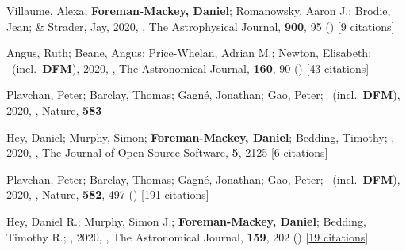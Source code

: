 \item[{\color{numcolor}\scriptsize59}] Villaume, Alexa; \textbf{Foreman-Mackey, Daniel}; Romanowsky, Aaron J.; Brodie, Jean; \& Strader, Jay, 2020, , The Astrophysical Journal, \textbf{900}, 95 () [\href{https://ui.adsabs.harvard.edu/abs/2020ApJ...900...95V}{9 citations}]

\item[{\color{numcolor}\scriptsize58}] Angus, Ruth; Beane, Angus; Price-Whelan, Adrian M.; Newton, Elisabeth; \etal\ (incl.\ \textbf{DFM}), 2020, , The Astronomical Journal, \textbf{160}, 90 () [\href{https://ui.adsabs.harvard.edu/abs/2020AJ....160...90A}{43 citations}]

\item[{\color{numcolor}\scriptsize57}] Plavchan, Peter; Barclay, Thomas; Gagn{\'e}, Jonathan; Gao, Peter; \etal\ (incl.\ \textbf{DFM}), 2020, , Nature, \textbf{583}

\item[{\color{numcolor}\scriptsize56}] Hey, Daniel; Murphy, Simon; \textbf{Foreman-Mackey, Daniel}; Bedding, Timothy; \etal, 2020, , The Journal of Open Source Software, \textbf{5}, 2125 [\href{https://ui.adsabs.harvard.edu/abs/2020JOSS....5.2125H}{6 citations}]

\item[{\color{numcolor}\scriptsize55}] Plavchan, Peter; Barclay, Thomas; Gagn{\'e}, Jonathan; Gao, Peter; \etal\ (incl.\ \textbf{DFM}), 2020, , Nature, \textbf{582}, 497 () [\href{https://ui.adsabs.harvard.edu/abs/2020Natur.582..497P}{191 citations}]

\item[{\color{numcolor}\scriptsize54}] Hey, Daniel R.; Murphy, Simon J.; \textbf{Foreman-Mackey, Daniel}; Bedding, Timothy R.; \etal, 2020, , The Astronomical Journal, \textbf{159}, 202 () [\href{https://ui.adsabs.harvard.edu/abs/2020AJ....159..202H}{19 citations}]

